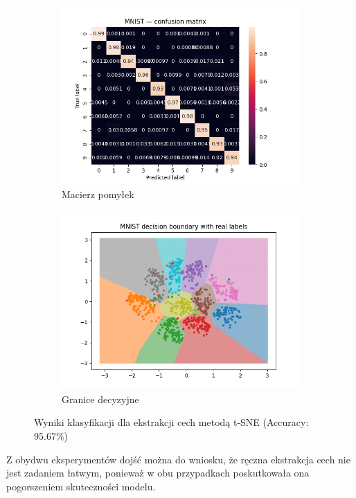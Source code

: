 \documentclass[10pt]{article}
\begin{document}
\begin{figure}[H]
    \centering
    \begin{subfigure}[t]{.5\textwidth}\centering
        \includegraphics[width=\linewidth]{img/mnist_tsne_cm.png}
        \caption{Macierz pomyłek}\label{fig:tsne-cm}
    \end{subfigure}
    \hspace{-3em}
    \begin{subfigure}[t]{.5\textwidth}\centering
        \includegraphics[width=\linewidth]{img/mnist_tsne_db.png}
        \caption{Granice decyzyjne}\label{fig:tsne-db}
    \end{subfigure}
    \caption{Wyniki klasyfikacji dla ekstrakcji cech metodą t-SNE (Accuracy: 95.67\%)}
\end{figure}

Z obydwu eksperymentów dojść można do wniosku, 
że ręczna ekstrakcja cech nie jest zadaniem łatwym, 
ponieważ w obu przypadkach poskutkowała ona pogorszeniem skuteczności modelu.
\end{document}
